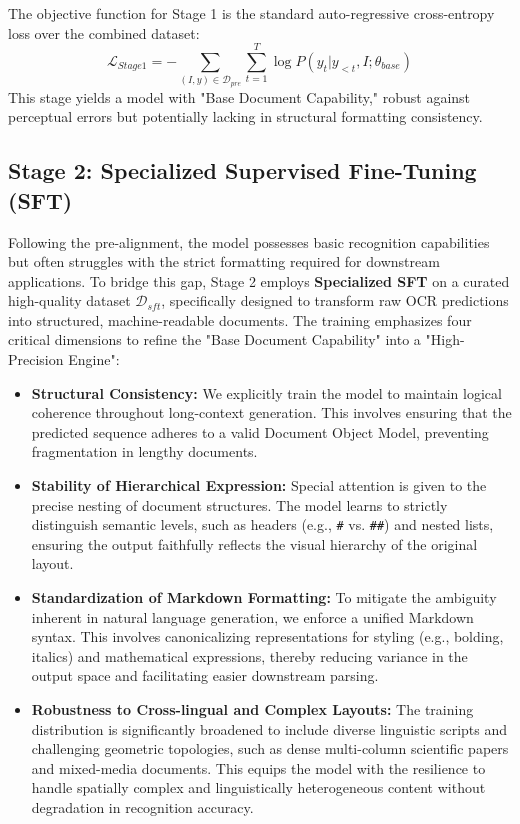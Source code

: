 The objective function for Stage 1 is the standard auto-regressive cross-entropy loss over the combined dataset:
\begin{equation}
    \mathcal{L}_{Stage1} = - \sum_{(I, y) \in \mathcal{D}_{pre}} \sum_{t=1}^{T} \log P(y_t | y_{<t}, I; \theta_{base})
\end{equation}
This stage yields a model with "Base Document Capability," robust against perceptual errors but potentially lacking in structural formatting consistency.

\subsection{Stage 2: Specialized Supervised Fine-Tuning (SFT)}
Following the pre-alignment, the model possesses basic recognition capabilities but often struggles with the strict formatting required for downstream applications. To bridge this gap, Stage 2 employs \textbf{Specialized SFT} on a curated high-quality dataset $\mathcal{D}_{sft}$, specifically designed to transform raw OCR predictions into structured, machine-readable documents. The training emphasizes four critical dimensions to refine the "Base Document Capability" into a "High-Precision Engine":

\begin{itemize}
    \item \textbf{Structural Consistency:} We explicitly train the model to maintain logical coherence throughout long-context generation. This involves ensuring that the predicted sequence adheres to a valid Document Object Model, preventing fragmentation in lengthy documents.
    \item \textbf{Stability of Hierarchical Expression:} Special attention is given to the precise nesting of document structures. The model learns to strictly distinguish semantic levels, such as headers (e.g., \texttt{\#} vs. \texttt{\#\#}) and nested lists, ensuring the output faithfully reflects the visual hierarchy of the original layout.
    \item \textbf{Standardization of Markdown Formatting:} To mitigate the ambiguity inherent in natural language generation, we enforce a unified Markdown syntax. This involves canonicalizing representations for styling (e.g., bolding, italics) and mathematical expressions, thereby reducing variance in the output space and facilitating easier downstream parsing.
    \item \textbf{Robustness to Cross-lingual and Complex Layouts:} The training distribution is significantly broadened to include diverse linguistic scripts and challenging geometric topologies, such as dense multi-column scientific papers and mixed-media documents. This equips the model with the resilience to handle spatially complex and linguistically heterogeneous content without degradation in recognition accuracy.
\end{itemize}


